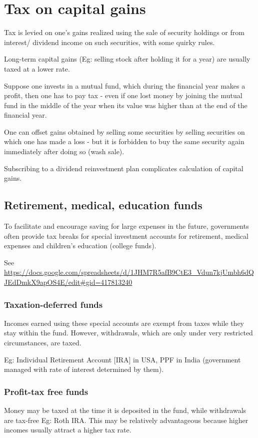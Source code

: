 \documentclass[oneside, article]{memoir}
\begin{document}
\section{Tax on capital gains}
Tax is levied on one's gains realized using the sale of security holdings or from interest/ dividend income on such securities, with some quirky rules.

Long-term capital gains (Eg: selling stock after holding it for a year) are usually taxed at a lower rate.

Suppose one invests in a mutual fund, which during the financial year makes a profit, then one has to pay tax - even if one lost money by joining the mutual fund in the middle of the year when its value was higher than at the end of the financial year.

One can offset gains obtained by selling some securities by selling securities on which one has made a loss - but it is forbidden to buy the same security again immediately after doing so (wash sale).

Subscribing to a dividend reinvestment plan complicates calculation of capital gains.

\subsection{Retirement, medical, education funds}
To facilitate and encourage saving for large expenses in the future, governments often provide tax breaks for special investment accounts for retirement, medical expenses and children's education (college funds). 

See \url{https://docs.google.com/spreadsheets/d/1JHM7R5afB9CtE3_Vdun7kjUmbh6dQJEdDmkX9apOS4E/edit#gid=417813240} 

\subsubsection{Taxation-deferred funds}
Incomes earned using these special accounts are exempt from taxes while they stay within the fund. However, withdrawals, which are only under very restricted circumstances, are taxed. 

Eg: Individual Retirement Account [IRA] in USA, PPF in India (government managed with rate of interest determined by them). 

\subsubsection{Profit-tax free funds}
Money may be taxed at the time it is deposited in the fund, while withdrawals are tax-free Eg: Roth IRA. This may be relatively advantageous because higher incomes usually attract a higher tax rate.
\end{document}

